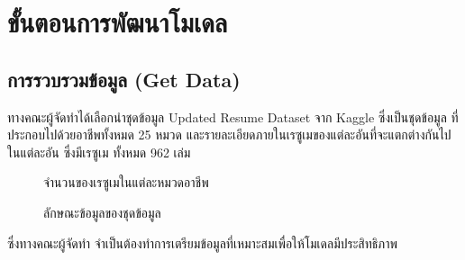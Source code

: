 \section{ขั้นตอนการพัฒนาโมเดล}
\subsection{การรวบรวมข้อมูล (Get Data)}
ทางคณะผู้จัดทำได้เลือกนำชุดข้อมูล Updated Resume Dataset \cite{dataset} จาก Kaggle ซึ่งเป็นชุดข้อมูล
ที่ประกอบไปด้วยอาชีพทั้งหมด 25 หมวด และรายละเอียดภายในเรซูเมของแต่ละอันที่จะแตกต่างกันไปในแต่ละอัน ซึ่งมีเรซูเม
ทั้งหมด 962 เล่ม
\begin{figure}[h]\centering
    \setlength{\fboxrule}{0.2mm} %
    \setlength{\fboxsep}{0.5cm}
    \caption{จำนวนของเรซูเมในแต่ละหมวดอาชีพ}\label{fig:datasetCategory}
\end{figure}
\begin{figure}[h]\centering
    \setlength{\fboxrule}{0.2mm} %
    \setlength{\fboxsep}{0.5cm}
    \caption{ลักษณะข้อมูลของชุดข้อมูล}\label{fig:datasetData}
\end{figure}
\par ซึ่งทางคณะผู้จัดทำ จำเป็นต้องทำการเตรียมข้อมูลที่เหมาะสมเพื่อให้โมเดลมีประสิทธิภาพ

